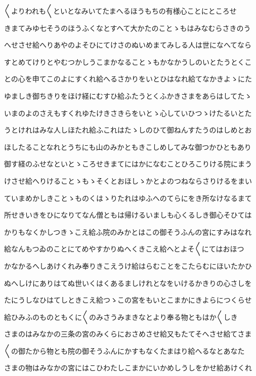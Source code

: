 \documentclass[a4paper,11pt,landscape]{ltjtarticle}
\begin{document}
〱よりわれも〱といとなみいてたまへるほうもちの有様心ことにところせ
\par\medskip
きまてみゆ七そうのほうふくなとすへて大かたのことゝもはみなむらさきのう
\par\medskip
へせさせ給へりあやのよそひにてけさのぬいめまてみしる人は世になへてなら
\par\medskip
すとめてけりとやむつかしうこまかなることゝもかなかうしのいとたうとくこ
\par\medskip
との心を申てこのよにすくれ給へるさかりをいとひはなれ給てなかきよゝにた
\par\medskip
ゆましき御ちきりをほけ経にむすひ給ふたうとくふかきさまをあらはしてたゝ
\par\medskip
いまのよのさえもすくれゆたけきさきらをいとゝ心していひつゝけたるいとた
\par\medskip
うとけれはみな人しほたれ給ふこれはたゝしのひて御ねんすたうのはしめとお
\par\medskip
ほしたることなれとうちにも山のみかともきこしめしてみな御つかひともあり
\par\medskip
御す経のふせなといとゝころせきまてにはかになむことひろこりける院にまう
\par\medskip
けさせ給へりけることゝもゝそくとおほしゝかとよのつねならさりけるをまい
\par\medskip
ていまめかしきことゝものくはゝりたれはゆふへのてらにをき所なけなるまて
\par\medskip
所せきいきをひになりてなん僧ともは帰けるいましも心くるしき御心そひては
\par\medskip
かりもなくかしつきゝこえ給ふ院のみかとはこの御そうふんの宮にすみはなれ
\par\medskip
給なんもつゐのことにてめやすかりぬへくきこえ給へとよそ〱にてはおほつ
\par\medskip
かなかるへしあけくれみ奉りきこえうけ給はらむことをこたらむにほいたかひ
\par\medskip
ぬへしけにありはてぬ世いくはくあるましけれとなをいけるかきりの心さしを
\par\medskip
たにうしなひはてしときこえ給つゝこの宮をもいとこまかにきよらにつくらせ
\par\medskip
給ひみふのものともくに〱のみさうみまきなとより奉る物ともはか〱しき
\par\medskip
さまのはみなかの三条の宮のみくらにおさめさせ給又もたてそへさせ給てさま
\par\medskip
〱の御たから物とも院の御そうふんにかすもなくたまはり給へるなとあなた
\par\medskip
さまの物はみなかの宮にはこひわたしこまかにいかめしうしをかせ給あけくれ
\end{document}
